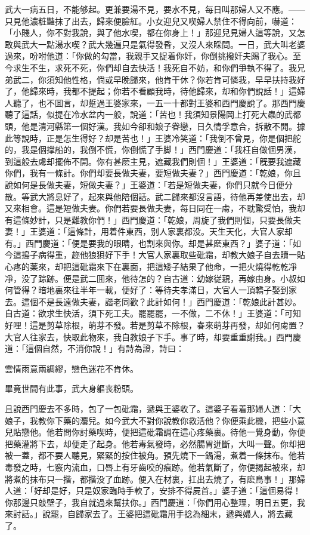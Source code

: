 武大一病五日，不能够起。更兼要湯不見，要水不見，每日叫那婦人又不應。——只見他濃粧豔抹了出去，歸來便臉紅。小女迎兒又喫婦人禁住不得向前，嚇道：「小賤人，你不對我說，與了他水喫，都在你身上！」那迎兒見婦人這等說，又怎敢與武大一點湯水喫？武大幾遍只是氣得發昏，又沒人來睬問。一日，武大叫老婆過來，吩咐他道：「你做的勾當，我親手又捉着你奸，你倒挑撥奸夫踢了我心。至今求生不生，求死不死，你們却自去快活！我死自不妨，和你們爭執不得了。我兄弟武二，你須知他性格，倘或早晚歸來，他肯干休？你若肯可憐我，早早扶持我好了，他歸來時，我都不提起；你若不看顧我時，待他歸來，却和你們說話！」這婦人聽了，也不囬言，却踅過王婆家來，一五一十都對王婆和西門慶說了。那西門慶聽了這話，似提在冷水盆内一般，說道：「苦也！我須知景陽岡上打死大蟲的武都頭，他是清河縣第一個好漢。我如今卻和娘子眷戀，日久情孚意合，拆散不開。據此等說時，正是怎生得好？却是苦也！」王婆冷笑道：「我倒不曾見，你是個把舵的，我是個撑船的，我倒不慌，你倒慌了手脚！」西門慶道：「我枉自做個男漢，到這般去䖏却擺佈不開。你有甚麽主見，遮藏我們則個！」王婆道：「旣要我遮藏你們，我有一條計。你們却要長做夫妻，要短做夫妻？」西門慶道：「乾娘，你且說如何是長做夫妻，短做夫妻？」王婆道：「若是短做夫妻，你們只就今日便分散。等武大將息好了，起來與他陪個話。武二歸來都沒言語，待他再差使出去，却又來相會。這是短做夫妻。你們若要長做夫妻，每日同在一䖏，不耽驚受怕，我却有這條妙計，只是難教你們！」西門慶道：「乾娘，周旋了我們則個，只要長做夫妻！」王婆道：「這條計，用着件東西，别人家裏都没。天生天化，大官人家却有。」西門慶道：「便是要我的眼睛，也割來與你。却是甚麽東西？」婆子道：「如今這搗子病得重，趂他狼狽好下手！大官人家裏取些砒霜，却教大娘子自去贖一貼心疼的薬來，却把這砒霜來下在裏面，把這矮子結果了他命，一把火燒得乾乾凈凈，没了踪跡。便是武二囬來，他待怎的？自古道：幼嫁従親，再嫁由身。小叔如何管得？暗地裏來往半年一載，便好了：等待夫孝滿日，大官人一頂轎子娶到家去。這個不是長遠做夫妻，諧老同歡？此計如何！」西門慶道：「乾娘此計甚妙。自古道：欲求生快活，須下死工夫。罷罷罷，一不做，二不休！」王婆道：「可知好哩！這是剪草除根，萌芽不發。若是剪草不除根，春來萌芽再發，却如何䖏置？大官人往家去，快取此物來，我自教娘子下手。事了時，却要重重謝我。」西門慶道：「這個自然，不消你說！」有詩為證，詩曰：
\begin{myquote}
雲情雨意兩綢繆，戀色迷花不肯休。

畢竟世間有此事，武大身軀丧粉頭。
\end{myquote}

且說西門慶去不多時，包了一包砒霜，遞與王婆收了。這婆子看着那婦人道：「大娘子，我教你下藥的灋兒。如今武大不對你說教你救活他？你便乘此機，把些小意兒貼戀他。他若問你討藥喫時，便把這砒霜調在這心疼藥裏。待他一覺身動，你便把藥灌將下去，却便走了起身。他若毒氣發時，必然腸胃迸斷，大叫一聲。你却把被一蓋，都不要人聽見，緊緊的按住被角。預先燒下一鍋湯，煮着一條抹布。他若毒發之時，七竅内流血，口唇上有牙齒咬的痕跡。他若氣斷了，你便揭起被來，却將煮的抹布只一揩，都揩没了血跡。便入在材裏，扛出去燒了，有麽鳥事！」那婦人道：「好却是好，只是奴家臨時手軟了，安排不得屍首。」婆子道：「這個易得！你那邊只敲壁子，我自就過來幫扶你。」西門慶道：「你們用心整理，明日五更，我來討話。」說罷，自歸家去了。王婆把這砒霜用手捻為細末，遞與婦人，將去藏了。

